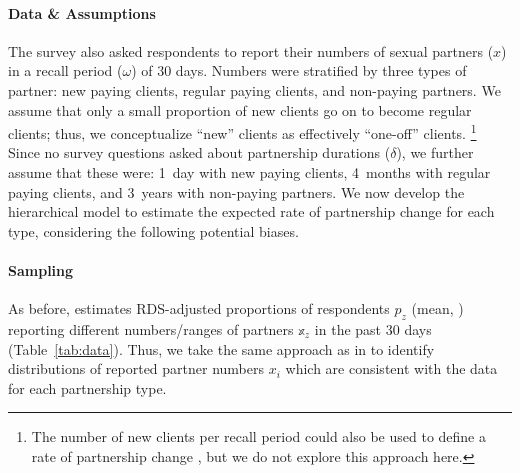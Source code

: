 \paragraph{Data \& Assumptions}
The survey \cite{Baral2014} also asked respondents to report
their numbers of sexual partners ($x$) in a recall period ($\omega$) of $30$ days.
Numbers were stratified by three types of partner:
new paying clients, regular paying clients, and non-paying partners.
We assume that only a small proportion of new clients go on to become regular clients;
thus, we conceptualize ``new'' clients as effectively ``one-off'' clients.%
\footnote{The number of new clients per recall period
  could also be used to define a rate of partnership change \cite{Fazito2012},
  but we do not explore this approach here.}
Since no survey questions asked about partnership durations ($\delta$),
we further assume that these were:
1~day with new paying clients,
4~months with regular paying clients, and
3~years with non-paying partners.
We now develop the hierarchical model to estimate
the expected rate of partnership change for each type,
considering the following potential biases.
\paragraph{Sampling}
As before, \cite{Baral2014} estimates RDS-adjusted proportions of respondents $p_z$ (mean, \ci)
reporting different numbers/ranges of partners $\mathbb{x}_z$ in the past 30 days
(Table~\ref{tab:data}).
Thus, we take the same approach as in 
to identify distributions of reported partner numbers $x_i$
which are consistent with the data for each partnership type.
